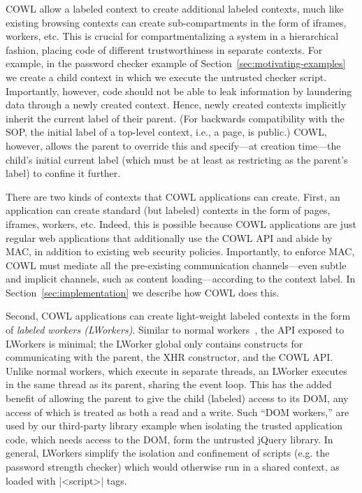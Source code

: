 COWL allow a labeled context to create additional labeled contexts,
much like existing browsing contexts can create sub-compartments
in the form of iframes, workers, etc.
%
This is crucial for compartmentalizing a system in a hierarchical
fashion, placing code of different trustworthiness in separate contexts.
%
For example, in the password checker example of
Section~\ref{sec:motivating-examples} we create a child context in
which we execute the untrusted checker script.
%
Importantly, however, code should not be able to leak information by
laundering data through a newly created context.
%
Hence, newly created contexts implicitly inherit the current label of
their parent.
%
(For backwards compatibility with the SOP, the initial label of a
top-level context, i.e., a page, is public.) 
%
COWL, however, allows the parent to override this and specify---at
creation time---the child's initial current label (which must be at
least as restricting as the parent's label) to confine it further.

There are two kinds of contexts that COWL applications can create.
%
First, an application can create standard (but labeled) contexts in
the form of pages, iframes, workers, etc.
%
Indeed, this is possible because COWL applications are just regular
web applications that additionally use the COWL API and abide by MAC,
in addition to existing web security policies.
%
Importantly, to enforce MAC, COWL must mediate all the pre-existing
communication channels---even subtle and implicit channels, such as
content loading---according to the context label.
%
In Section~\ref{sec:implementation} we describe how COWL does this.

Second, COWL applications can create light-weight labeled contexts
in the form of \emph{labeled workers (LWorkers)}.
%
Similar to normal workers~\cite{workers}, the API exposed to LWorkers is
minimal; the LWorker global only contains constructs for communicating
with the parent, the XHR constructor, and the COWL API.
%
Unlike normal workers, which execute in separate threads, an LWorker
executes in the same thread as its parent, sharing the event loop.
%
This has the added benefit of allowing the parent to give the child
(labeled) access to its DOM, any access of which is treated as both a
read and a write.
%
Such ``DOM workers,'' are used by our third-party library example when
isolating the trusted application code, which needs access to the DOM,
form the untrusted jQuery library.
%
In general, LWorkers simplify the isolation and confinement of scripts
(e.g. the password strength checker) which would otherwise run in a
shared context, as loaded with \js|<script>| tags.


